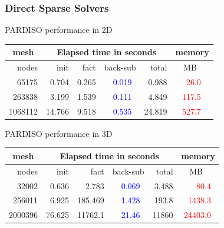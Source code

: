 \documentclass[handout]{beamer}
{
\usepackage{fullpage}
\usepackage{hyperref}
\usepackage{amssymb} 
}
\newcommand{\red}[1]{\textcolor{red}{#1}}
\newcommand{\blue}[1]{\textcolor{blue}{#1}}
\begin{document}
\begin{frame}
\frametitle{Direct Sparse Solvers}
\begin{block}{PARDISO performance in 2D}
\begin{table}
\centering
\begin{tabular}{||r||r|r|r|r||r||}
  \hline
  \multicolumn{1}{||c||}{mesh}
      & \multicolumn{4}{c||}{Elapsed time in seconds}
      & \multicolumn{1}{c||}{memory} \\
  \hline
  nodes & init & fact & back-sub & total & MB~~~\\
  \hline
    65175& 0.704 & 0.265 & \blue{0.019~} & 0.988 & \red{ 26.0~~} \\
   263838& 3.199 & 1.539 & \blue{0.111~} & 4.849 & \red{117.5~~} \\
  1068112& 14.766& 9.518 & \blue{0.535~} &24.819 & \red{527.7~~} \\
  \hline
\end{tabular}
\end{table}
\end{block}

\begin{block}{PARDISO performance in 3D}
\begin{table}
\centering
\begin{tabular}{||r||r|r|r|r||r||}
  \hline
  \multicolumn{1}{||c||}{mesh}
      & \multicolumn{4}{c||}{Elapsed time in seconds}
      & \multicolumn{1}{c||}{memory} \\
  \hline
  nodes   & init & fact & back-sub & total & MB~~~ \\
  \hline
    32002 &  0.636 &    2.783 & \blue{0.069~} & 3.488 & \red{   80.4~} \\
   256011 &  6.925 &  185.469 & \blue{1.428~} & 193.8 & \red{ 1438.3~} \\
  2000396 & 76.625 & 11762.1  & \blue{21.46~} & 11860 & \red{24403.0~}  \\
  \hline
\end{tabular}
\end{table}
\end{block}


\end{frame}
\end{document}
